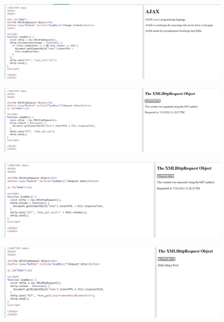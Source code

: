 \documentclass{article}
\begin{document}
\begin{itemize}
		\begin{figure}[H]
			\centering
			\includegraphics[width=1.0\textwidth,keepaspectratio]{img/A4.jpg}
		\end{figure}

		\begin{figure}[H]
			\centering
			\includegraphics[width=1.0\textwidth,keepaspectratio]{img/A5.jpg}
		\end{figure}

		\begin{figure}[H]
			\centering
			\includegraphics[width=1.0\textwidth,keepaspectratio]{img/A6.jpg}
		\end{figure}

		\begin{figure}[H]
			\centering
			\includegraphics[width=1.0\textwidth,keepaspectratio]{img/A7.jpg}
		\end{figure}


\end{itemize}
\end{document}
